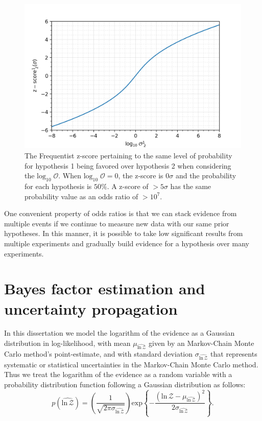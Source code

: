 \begin{figure}
  \includegraphics[width=\textwidth]{figs/chapter5/log10odds_z_score.png}
  \caption{The Frequentist z-score pertaining to the same level of probability for  hypothesis 1 being favored over hypothesis 2 when considering the $\mathrm{log}_{10} \; \mathcal{O}$. When $\mathrm{log}_{10} \; \mathcal{O} = 0$, the z-score is $0 \sigma$ and the probability for each hypothesis is $50\%$. A z-score of $>5 \sigma$ has the same probability value as an odds ratio of $> 10^7$.}
  \label{fig:log10odds_v_z_score}
\end{figure}

One convenient property of odds ratios is that we can stack evidence from multiple events if we continue to measure new data with our same prior hypotheses. In this manner, it is possible to take low significant results from multiple experiments and gradually build evidence for a hypothesis over many experiments.

\section{Bayes factor estimation and uncertainty propagation}
In this dissertation we model the logarithm of the evidence as a Gaussian distribution in log-likelihood, with mean $\mu_{\widehat{\mathrm{ln} \, \mathcal{Z}}}$ given by an Markov-Chain Monte Carlo method's point-estimate, and with standard deviation $\sigma_{\widehat{\mathrm{ln} \, \mathcal{Z}}}$ that represents systematic or statistical uncertainties in the Markov-Chain Monte Carlo method. Thus we treat the logarithm of the evidence as a random variable with a probability distribution function following a Gaussian distribution as follows:
\begin{equation}\label{eqn:p_log_z}
    p(\widehat{\mathrm{ln} \, \mathcal{Z}}) = \left(\frac{1}{\sqrt{2 \pi \sigma_{\widehat{\mathrm{ln} \, \mathcal{Z}}}}} \right) \mathrm{exp} \left \{-\frac{\left(\mathrm{ln} \, \mathcal{Z} - \mu_{\widehat{\mathrm{ln} \, \mathcal{Z}}}\right)^2} {2 \sigma_{\widehat{\mathrm{ln} \, \mathcal{Z}}}}  \right\}.
\end{equation}

